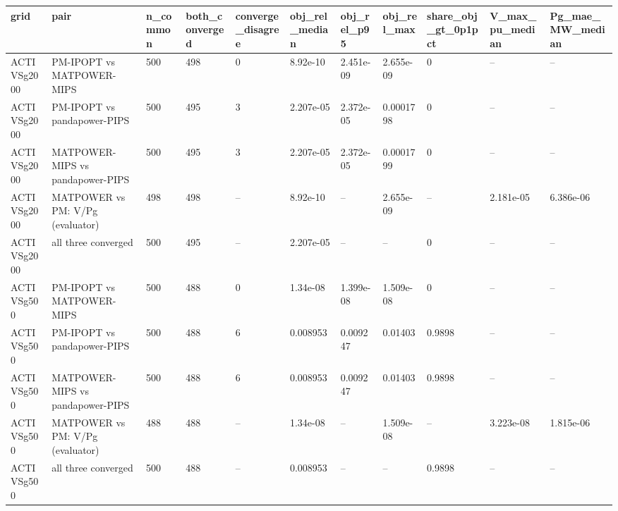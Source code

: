 \begin{tabular}{lllllllllll}
\hline
grid & pair & n\_common & both\_converged & converge\_disagree & obj\_rel\_median & obj\_rel\_p95 & obj\_rel\_max & share\_obj\_gt\_0p1pct & V\_max\_pu\_median & Pg\_mae\_MW\_median \\
\hline
ACTIVSg2000 & PM-IPOPT vs MATPOWER-MIPS & 500 & 498 & 0 & 8.92e-10 & 2.451e-09 & 2.655e-09 & 0 & -- & -- \\
ACTIVSg2000 & PM-IPOPT vs pandapower-PIPS & 500 & 495 & 3 & 2.207e-05 & 2.372e-05 & 0.0001798 & 0 & -- & -- \\
ACTIVSg2000 & MATPOWER-MIPS vs pandapower-PIPS & 500 & 495 & 3 & 2.207e-05 & 2.372e-05 & 0.0001799 & 0 & -- & -- \\
ACTIVSg2000 & MATPOWER vs PM: V/Pg (evaluator) & 498 & 498 & -- & 8.92e-10 & -- & 2.655e-09 & -- & 2.181e-05 & 6.386e-06 \\
ACTIVSg2000 & all three converged & 500 & 495 & -- & 2.207e-05 & -- & -- & 0 & -- & -- \\
ACTIVSg500 & PM-IPOPT vs MATPOWER-MIPS & 500 & 488 & 0 & 1.34e-08 & 1.399e-08 & 1.509e-08 & 0 & -- & -- \\
ACTIVSg500 & PM-IPOPT vs pandapower-PIPS & 500 & 488 & 6 & 0.008953 & 0.009247 & 0.01403 & 0.9898 & -- & -- \\
ACTIVSg500 & MATPOWER-MIPS vs pandapower-PIPS & 500 & 488 & 6 & 0.008953 & 0.009247 & 0.01403 & 0.9898 & -- & -- \\
ACTIVSg500 & MATPOWER vs PM: V/Pg (evaluator) & 488 & 488 & -- & 1.34e-08 & -- & 1.509e-08 & -- & 3.223e-08 & 1.815e-06 \\
ACTIVSg500 & all three converged & 500 & 488 & -- & 0.008953 & -- & -- & 0.9898 & -- & -- \\
\hline
\end{tabular}

